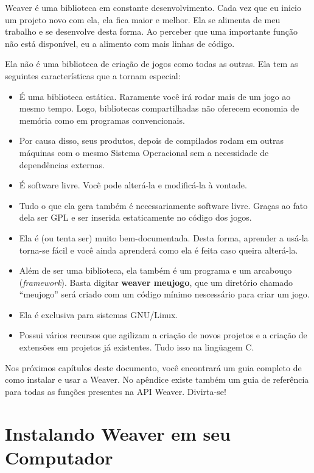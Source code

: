 \documentclass[11pt,a4paper]{book}
\begin{document}
Weaver é uma biblioteca em constante desenvolvimento. Cada vez que eu
inicio um projeto novo com ela, ela fica maior e melhor. Ela se
alimenta de meu trabalho e se desenvolve desta forma. Ao perceber que
uma importante função não está disponível, eu a alimento com mais
linhas de código. 

Ela não é uma biblioteca de criação de jogos como todas as outras. Ela
tem as seguintes características que a tornam especial:

\begin{itemize}
  \item É uma biblioteca estática. Raramente você irá rodar mais de um
    jogo ao mesmo tempo. Logo, bibliotecas compartilhadas não oferecem
    economia de memória como em programas convencionais.
  \item Por causa disso, seus produtos, depois de compilados rodam em
    outras máquinas com o mesmo Sistema Operacional sem a necessidade
    de dependências externas.
  \item É software livre. Você pode alterá-la e modificá-la à vontade.
  \item Tudo o que ela gera também é necessariamente software
    livre. Graças ao fato dela ser GPL e ser inserida estaticamente no
    código dos jogos.
  \item Ela é (ou tenta ser) muito bem-documentada. Desta forma,
    aprender a usá-la torna-se fácil e você ainda aprenderá como ela é
    feita caso queira alterá-la.
  \item Além de ser uma biblioteca, ela também é um programa e um
    arcabouço (\textit{framework}). Basta digitar \textbf{weaver
      meujogo}, que um diretório chamado ``meujogo'' será criado com
    um código mínimo nes\-ces\-sá\-rio para criar um jogo.
  \item Ela é exclusiva para sistemas GNU/Linux.
  \item Possui vários recursos que agilizam a criação de novos
    projetos e a criação de extensões em projetos já existentes. Tudo
    isso na lingüagem C.
\end{itemize}

Nos próximos capítulos deste documento, você encontrará um guia
completo de como instalar e usar a Weaver. No apêndice existe também
um guia de referência para todas as funções presentes na API
Weaver. Divirta-se!

\chapter{Instalando Weaver em seu Computador}
\end{document}
